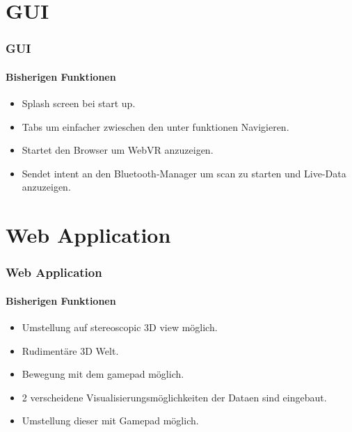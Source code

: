 \documentclass{beamer}
\begin{document}
\section{GUI}

\begin{frame}
\frametitle{GUI}
\framesubtitle{Bisherigen Funktionen}
\begin{itemize}
  \item Splash screen bei start up.
  \item Tabs um einfacher zwieschen den unter funktionen Navigieren.
  \item Startet den Browser um WebVR anzuzeigen.
  \item Sendet intent an den Bluetooth-Manager um scan zu starten und Live-Data anzuzeigen.
\end{itemize}
\end{frame}

\section{Web Application}

\begin{frame}
\frametitle{Web Application}
\framesubtitle{Bisherigen Funktionen}
\begin{itemize}
  \item Umstellung auf stereoscopic 3D view m\"oglich.
  \item Rudiment\"are 3D Welt.
  \item Bewegung mit dem gamepad m\"oglich.
  \item 2 verscheidene Visualisierungsmöglichkeiten der Dataen sind eingebaut.
  \item Umstellung dieser mit Gamepad m\"oglich.
\end{itemize}
\end{frame}
\end{document}
